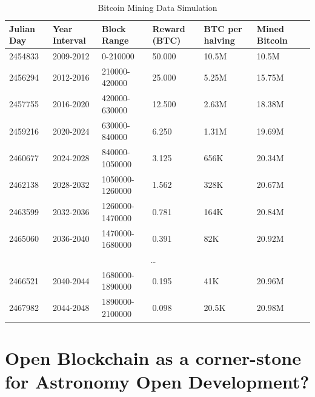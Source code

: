 \documentclass[final,5p,times,twocolumn,authoryear]{elsarticle}
\begin{document}
\begin{table}[htbp]
\centering
\caption{Bitcoin Mining Data Simulation}
\begin{adjustbox}{width=\columnwidth,center}
\begin{tabular}{@{}lllllll@{}}
\toprule
Julian Day & Year Interval & Block Range & Reward (BTC) & BTC per halving & Mined Bitcoin \\ \midrule
2454833    & 2009-2012     & 0-210000     & 50.000       & 10.5M         & 10.5M         \\
2456294    & 2012-2016     & 210000-420000& 25.000       & 5.25M         & 15.75M        \\
2457755    & 2016-2020     & 420000-630000& 12.500       & 2.63M         & 18.38M        \\
2459216    & 2020-2024     & 630000-840000& 6.250        & 1.31M         & 19.69M        \\
2460677    & 2024-2028     & 840000-1050000& 3.125       & 656K          & 20.34M        \\
2462138    & 2028-2032     & 1050000-1260000& 1.562      & 328K          & 20.67M        \\
2463599    & 2032-2036     & 1260000-1470000& 0.781      & 164K          & 20.84M        \\
2465060    & 2036-2040     & 1470000-1680000& 0.391      & 82K           & 20.92M        \\
\multicolumn{6}{c}{\dots} \\ %
2466521    & 2040-2044     & 1680000-1890000& 0.195      & 41K           & 20.96M        \\
2467982    & 2044-2048     & 1890000-2100000& 0.098      & 20.5K         & 20.98M        \\
\bottomrule
\end{tabular}
\end{adjustbox}
\end{table}

\section{Open Blockchain as a corner-stone for Astronomy Open Development?}
\label{sec:bc_review}
\end{document}
